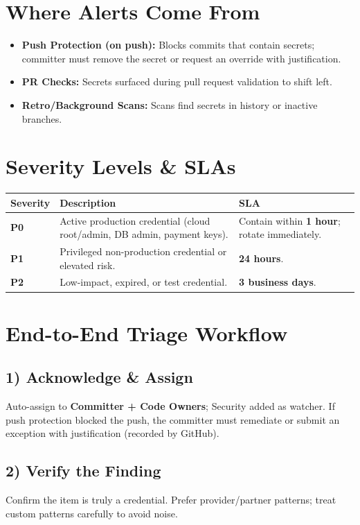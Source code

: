 \documentclass[11pt,a4paper]{article}
\begin{document}
\section{Where Alerts Come From}
\begin{itemize}[leftmargin=1.2em]
  \item \textbf{Push Protection (on push):} Blocks commits that contain secrets; committer must remove the secret or request an override with justification.
  \item \textbf{PR Checks:} Secrets surfaced during pull request validation to shift left.
  \item \textbf{Retro/Background Scans:} Scans find secrets in history or inactive branches.
\end{itemize}

\section{Severity Levels \& SLAs}
\begin{tabularx}{\linewidth}{p{6em} p{20em} p{8em}}
\toprule
\textbf{Severity} & \textbf{Description} & \textbf{SLA} \\
\midrule
\textcolor{crit}{\textbf{P0}} & Active production credential (cloud root/admin, DB admin, payment keys). & Contain within \textbf{1 hour}; rotate immediately. \\
\textcolor{warn}{\textbf{P1}} & Privileged non-production credential or elevated risk. & \textbf{24 hours}. \\
\textcolor{ok}{\textbf{P2}} & Low-impact, expired, or test credential. & \textbf{3 business days}. \\
\bottomrule
\end{tabularx}
\clearpage

\section{End-to-End Triage Workflow}
\subsection*{1) Acknowledge \& Assign}
Auto-assign to \textbf{Committer + Code Owners}; Security added as watcher. If push protection blocked the push, the committer must remediate or submit an exception with justification (recorded by GitHub).

\subsection*{2) Verify the Finding}
Confirm the item is truly a credential. Prefer provider/partner patterns; treat custom patterns carefully to avoid noise.
\end{document}
